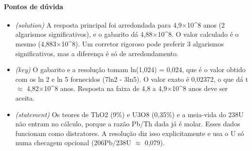 \documentclass{article}%
\begin{document}
\paragraph{Pontos de dúvida}%
\begin{itemize}%
\item%
\textit{(solution)} A resposta principal foi arredondada para 4,9$\times$10\^{}8 anos (2 algarismos significativos), e o gabarito dá 4,88$\times$10\^{}8. O valor calculado é o mesmo (4,883$\times$10\^{}8). Um corretor rigoroso pode preferir 3 algarismos significativos, mas a diferença é só de arredondamento.%
\item%
\textit{(key)} O gabarito e a resolução tomam ln(1,024) = 0,024, que é o valor obtido com os ln 2 e ln 5 fornecidos (7ln2 - 3ln5). O valor exato é 0,02372, o que dá t $\approx$ 4,82$\times$10\^{}8 anos. Resposta na faixa de 4,8 a 4,9$\times$10\^{}8 anos deve ser aceita.%
\item%
\textit{(statement)} Os teores de ThO2 (9\%) e U3O8 (0,35\%) e a meia{-}vida do 238U não entram no cálculo, porque a razão Pb/Th dada já é molar. Esses dados funcionam como distratores. A resolução diz isso explicitamente e usa o U só numa checagem opcional (206Pb/238U $\approx$ 0,079).%
\end{itemize}%
\end{document}
